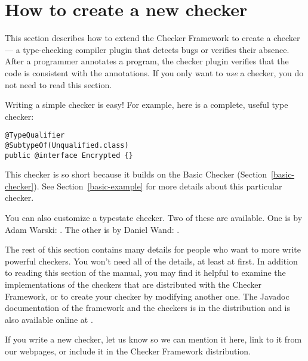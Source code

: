 \htmlhr
\section{How to create a new checker\label{writing-a-checker}}

\newcommand{\TreeAPIBase}{http://java.sun.com/javase/6/docs/jdk/api/javac/tree/com/sun/source}
\newcommand{\refTreeclass}[2]{\ahref{\TreeAPIBase{}/#1/#2.html?is-external=true}{\<#2>}}
\newcommand{\ModelAPIBase}{http://java.sun.com/javase/6/docs/api/javax/lang/model}
\newcommand{\refModelclass}[2]{\ahref{\ModelAPIBase{}/#1/#2.html?is-external=true}{\<#2>}}

This section describes how to extend the Checker Framework to create a checker
--- a type-checking compiler plugin that detects bugs or verifies their
absence.  After a programmer annotates a program,
the checker plugin verifies that the code is consistent
with the annotations.
If you only want to \emph{use} a checker, you do not need to read this
section.

Writing a simple checker is easy!  For example, here is a complete, useful
type checker:

\begin{Verbatim}
@TypeQualifier
@SubtypeOf(Unqualified.class)
public @interface Encrypted {}
\end{Verbatim}

This checker is so short because it builds on the Basic Checker
(Section~\ref{basic-checker}).
See Section~\ref{basic-example} for more details about this particular checker.

You can also customize a typestate checker.
Two of these are available.  One is by Adam Warski:  
.
The other is by Daniel Wand:
.


The rest of this section contains many details for people who want to more write powerful
checkers.
You won't need all of the details, at least at first.
In addition to reading this section of the manual, you may find it helpful
to examine the implementations of the checkers that are distributed with
the Checker Framework, or to create your checker by modifying another one.
The Javadoc documentation of the framework and the checkers is in the
distribution and is also available online at
.

If you write a new checker, let us know so we can mention it here, link to
it from our webpages, or include it in the Checker Framework distribution.


